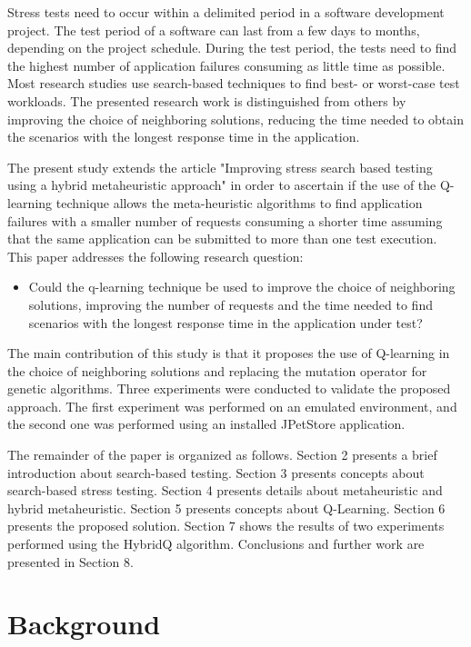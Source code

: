 \documentclass{bmcart}
\begin{document}
Stress tests need to occur within a delimited period in a software development project. The test period of a software can last from a few days to months, depending on the project schedule. During the test period, the tests need to find the highest number of application failures consuming as little time as possible. Most research studies use search-based techniques to find best- or worst-case test workloads. The presented research work is distinguished from others by improving the choice of neighboring solutions, reducing the time needed to obtain the scenarios with the longest response time in the application. 

The present study extends the article "Improving stress search based testing using a hybrid metaheuristic approach"  \citep{Gois2016} in order to ascertain if the use of the Q-learning technique allows the meta-heuristic algorithms to find application failures with a smaller number of requests consuming a shorter time assuming that the same application can be submitted to more than one test execution. This paper  addresses the following  research question:

\begin{itemize}
\item Could the q-learning technique be used to improve the choice of neighboring solutions, improving the number of requests and the time needed to find scenarios with the longest response time in the application under test?
\end{itemize}

The main contribution of this study is that it proposes the use of Q-learning in the choice of neighboring solutions and replacing the mutation operator for genetic algorithms. Three experiments were conducted to validate the proposed approach. The first experiment was performed on an emulated environment, and the second one was performed using an installed JPetStore application.

The remainder of the paper is organized as follows. Section 2 presents a brief introduction about search-based testing. Section 3 presents concepts about  search-based stress testing. Section 4 presents details about metaheuristic and hybrid metaheuristic. Section 5 presents concepts about Q-Learning. Section 6 presents the proposed solution. Section 7 shows the results of two experiments performed using the HybridQ algorithm.  Conclusions and further work are presented in Section 8.

\section{Background}
\end{document}
